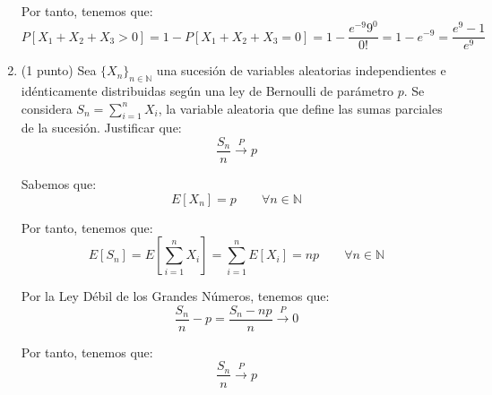 \documentclass[12pt]{article}
\begin{document}
\begin{ejercicio}[1.5 puntos]
\begin{enumerate}
            Por tanto, tenemos que:
            \begin{equation*}
                P[X_1 + X_2 + X_3 > 0] = 1 - P[X_1 + X_2 + X_3 = 0] = 1 - \frac{e^{-9}9^0}{0!} = 1 - e^{-9} = \frac{e^9 - 1}{e^9}
            \end{equation*}

            \item (1 punto) Sea $\{X_n\}_{n \in \mathbb{N}}$ una sucesión de variables aleatorias independientes e idénticamente distribuidas según una ley de Bernoulli de parámetro $p$. Se considera $S_n = \sum\limits_{i=1}^n X_i$, la variable aleatoria que define las sumas parciales de la sucesión. Justificar que: $$\frac{S_n}{n} \xrightarrow{P} p$$
            
            Sabemos que:
            \begin{equation*}
                E[X_n] = p\qquad \forall n \in \mathbb{N}
            \end{equation*}

            Por tanto, tenemos que:
            \begin{equation*}
                E[S_n] = E\left[\sum_{i=1}^n X_i\right] = \sum_{i=1}^n E[X_i] = np\qquad \forall n \in \mathbb{N}
            \end{equation*}
            
            Por la Ley Débil de los Grandes Números, tenemos que:
            \begin{equation*}
                \frac{S_n}{n}-p = \frac{S_n-np}{n} \xrightarrow{P} 0
            \end{equation*}

            Por tanto, tenemos que:
            \begin{equation*}
                \frac{S_n}{n} \xrightarrow{P} p
            \end{equation*}
        \end{enumerate}
    \end{ejercicio}
\end{document}
